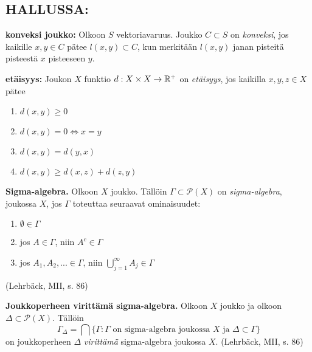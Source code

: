 


\subsection{HALLUSSA:}
\begin{definition}
    \textbf{konveksi joukko:} Olkoon $S$ vektoriavaruus. Joukko $C \subset S$ on \textit{konveksi}, jos kaikille $x, y \in C$ pätee $l(x,y) \subset C$, kun merkitään $l(x,y)$ janan pisteitä pisteestä $x$ pisteeseen $y$.
\end{definition}
\begin{definition}
    \textbf{etäisyys:} Joukon $X$ funktio $d: X\times X \to \mathbb{R}^+$ on \textit{etäisyys}, jos kaikilla $x, y, z \in X$ pätee
    \begin{enumerate}
        \item $d(x,y) \ge 0$
        \item $d(x,y) = 0 \iff x = y$
        \item $d(x,y) = d(y,x)$
        \item $d(x,y) \ge d(x,z) + d(z,y)$
    \end{enumerate}
\end{definition}

\begin{definition}
    \textbf{Sigma-algebra. } Olkoon $X$ joukko. Tällöin $\Gamma \subset \mathcal P(X)$ on \textit{sigma-algebra}, joukossa $X$, jos $\Gamma$ toteuttaa seuraavat ominaisuudet:
    \begin{enumerate}
        \item $\emptyset \in \Gamma$ 
        \item jos $A \in \Gamma$, niin $A^c \in \Gamma$
        \item jos $A_1, A_2, ... \in \Gamma$, niin $\bigcup_{j=1}^\infty A_j \in \Gamma$ 
    \end{enumerate}
    (Lehrbäck, MII, s. 86)
\end{definition}

\begin{definition}
    \textbf{Joukkoperheen virittämä sigma-algebra. } Olkoon $X$ joukko ja olkoon $\Delta \subset \mathcal P (X)$. Tällöin 
        $$ \Gamma_\Delta = \bigcap \{\Gamma : \Gamma \text{ on sigma-algebra joukossa } X \text{ ja }  \Delta \subset \Gamma \}$$ 
    on joukkoperheen $\Delta$ \textit{virittämä} sigma-algebra joukossa $X$.
    (Lehrbäck, MII, s. 86)
\end{definition}

